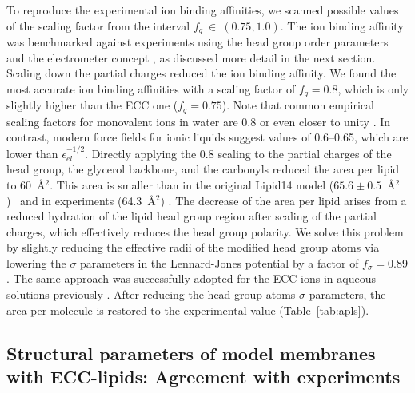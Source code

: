 To reproduce the experimental ion binding affinities, 
we scanned possible values of the scaling factor from the interval $f_q~\in~(0.75, 1.0)$. 
The ion binding affinity was benchmarked against experiments 
using the head group order parameters and the electrometer concept \citep{seelig87,catte16}, 
as discussed more detail in the next section. 
Scaling down the partial charges reduced the ion binding affinity. 
We found the most accurate ion binding affinities with a scaling factor of $f_q = 0.8$, 
which is only slightly higher than the ECC one ($f_q=0.75$). 
Note that common empirical scaling factors for monovalent ions in water are 0.8 or
even closer to unity \citep{benavides17,skinner14,nacleps}.  In contrast, modern force fields
for ionic liquids suggest values of 0.6--0.65, which are lower than $\epsilon^{-1/2}_{el}$\citep{holm14}.
Directly applying 
the 0.8 scaling to the partial charges of the head group, the glycerol backbone, and 
the carbonyls reduced the area per lipid to 60~Å$^2$. This area is smaller than in the 
original Lipid14 model ($65.6 \pm 0.5$~Å$^2$)~\citep{dickson14} and in experiments 
(64.3~Å$^2$) \citep{kucerka11}. The decrease of the area per lipid arises from a 
reduced hydration of the lipid head group region after scaling of the partial charges, which effectively 
reduces the head group polarity. We solve this problem by slightly reducing the effective radii of 
the modified head group atoms via lowering the $\sigma$ parameters in the Lennard-Jones potential by a 
factor of $f_\sigma = 0.89$. The same approach was successfully adopted for the ECC ions in aqueous 
solutions previously \citep{kohagen14, kohagen16, Pluharova2014, martinek17}. After reducing the head group atoms $\sigma$ parameters, the area per molecule is restored to the experimental value (Table~\ref{tab:apls}).  


\subsection{Structural parameters of model membranes with ECC-lipids: Agreement with experiments} 
 
